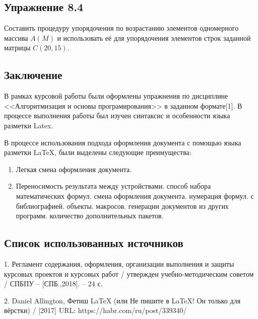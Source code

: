 \subsection{\fontsize{14pt}{16.8pt}Упражнение 8.4}
\noindent
Составить процедуру упорядочения по возрастанию элементов одномерного массива $A(M)$ и использовать её для упорядочения элементов строк заданной матрицы $C(20,15).$

\newpage
\begin{center}
\section*{Заключение}
\label{sec:close}
\end{center}
\par
\fontsize{14pt}{16.8pt}\selectfont
В рамках курсовой работы были оформлены упражнения по дисциплине <<Алгоритмизация и основы програмирования>> в заданном формате[1].
В процессе выполнения работы был изучен синтаксис и особенности языка разметки Latex. 
\par
\fontsize{14pt}{16.8pt}\selectfont
В процессе использования подхода оформления документа с помощью языка разметки LaTeX, были выделены следующие преимущества:
\begin{spacing}{0.9}
\fontsize{14pt}{16.8pt}\selectfont
\begin{enumerate} 
  \item Легкая смена оформления документа.
  \item Переносимость результата между устройствами.
  способ набора математических формул.
 смена оформления документа.
 нумерация формул.
 с библиографией.
 объекты.
 макросов.
 генерации документов из других программ.
 количество дополнительных пакетов.
\end{enumerate}
\end{spacing}

\newpage
\begin{center}
\section*{Список использованных источников}
\end{center}
\par
1. Регламент содержания, оформления, организации выполнения и защиты курсовых проектов и курсовых работ / утвержден учебно-методическим советом / СПБПУ – [СПБ.,2018]. – 24 с.
\par
2. Daniel Allington, Фетиш LaTeX (или Не пишите в LaTeX! Он только для вёрстки) / [2017]
URL: https://habr.com/ru/post/339340/